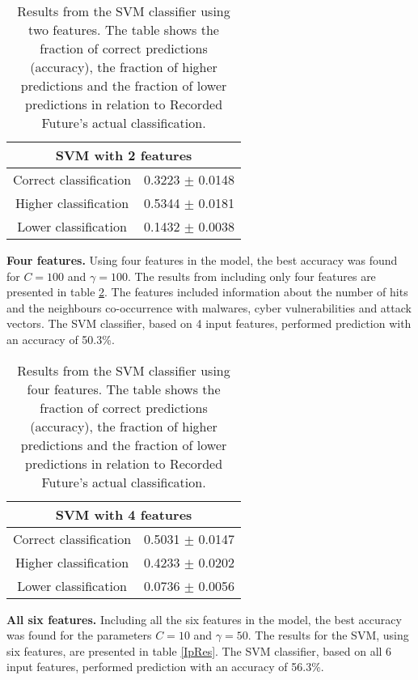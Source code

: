 \begin{table}[h!]
    \centering
    \caption{Results from the SVM classifier using two features. The table shows the fraction of correct predictions (accuracy), the fraction of higher predictions and the fraction of lower predictions in relation to Recorded Future's actual classification.}
    \begin{tabular}{|c|c|}
    \hline
        \multicolumn{2}{|c|}{SVM with 2 features}\\ \hline
        Correct classification  & 0.3223 $\pm$ 0.0148 \\
        Higher classification   & 0.5344 $\pm$ 0.0181 \\
        Lower classification    & 0.1432 $\pm$ 0.0038 \\ \hline
    \end{tabular}
    \label{IpRes2Feat}
\end{table}


\textbf{Four features.} Using four features in the model, the best accuracy was found for $C=100$ and $\gamma=100$. The results from including only four features are presented in table \ref{IpRes4Feat}. The features included information about the number of hits and the neighbours co-occurrence with malwares, cyber vulnerabilities and attack vectors.  The SVM classifier, based on 4 input features, performed prediction with an accuracy of 50.3\%.

\begin{table}[h!]
    \centering
    \caption{Results from the SVM classifier using four features. The table shows the fraction of correct predictions (accuracy), the fraction of higher predictions and the fraction of lower predictions in relation to Recorded Future's actual classification.}
    \begin{tabular}{|c|c|}
    \hline
        \multicolumn{2}{|c|}{SVM with 4 features}\\ \hline
        Correct classification  & 0.5031 $\pm$ 0.0147 \\
        Higher classification   & 0.4233 $\pm$ 0.0202 \\
        Lower classification    & 0.0736 $\pm$ 0.0056 \\ \hline
    \end{tabular}
    \label{IpRes4Feat}
\end{table}


\textbf{All six features.} Including all the six features in the model, the best accuracy was found for the parameters $C=10$ and $\gamma=50$. The results for the SVM, using six features, are presented in table \ref{IpRes}. The SVM classifier, based on all 6 input features, performed prediction with an accuracy of 56.3\%.

